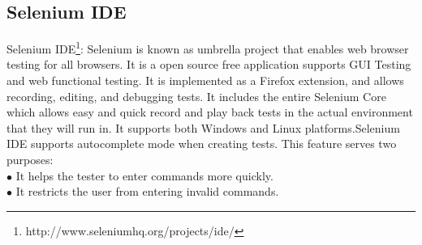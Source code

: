 \documentclass[12pt,journal]{IEEEtran}
\begin{document}
\subsection{Selenium IDE}
Selenium IDE\footnote{http://www.seleniumhq.org/projects/ide/}: Selenium is known as umbrella project that enables web browser testing for all browsers. It is a open source free application supports GUI Testing and web functional testing. It is implemented as a Firefox extension, and allows recording, editing, and debugging tests. It includes the entire Selenium Core which allows easy and quick record and play back tests in the actual environment that they will run in. It supports both Windows and Linux platforms.Selenium IDE supports autocomplete mode when creating tests. This feature serves two purposes:\\
$\bullet$ It helps the tester to enter commands more quickly.\\
$\bullet$ It restricts the user from entering invalid commands.\\
\end{document}
